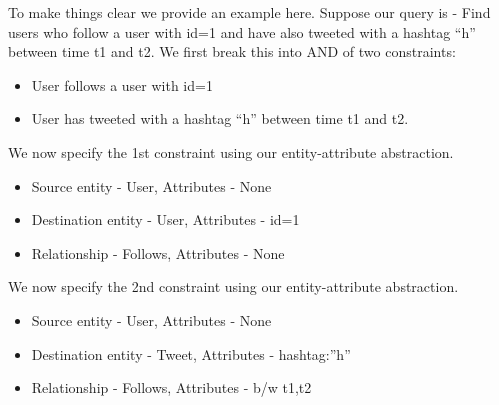 \documentclass[letterpaper,10pt,english]{sphinxmanual}
\begin{document}
To make things clear we provide an example here.
Suppose our query is - Find users who follow a user with id=1 and have also tweeted with a hashtag “h” between time t1 and t2.
We first break this into AND of two constraints:
\begin{itemize}
\item {} 
User follows a user with id=1

\item {} 
User has tweeted with a hashtag “h” between time t1 and t2.

\end{itemize}

We now specify the 1st constraint using our entity-attribute abstraction.
\begin{itemize}
\item {} 
Source entity - User, Attributes - None

\item {} 
Destination entity - User, Attributes - id=1

\item {} 
Relationship - Follows, Attributes - None

\end{itemize}

We now specify the 2nd constraint using our entity-attribute abstraction.
\begin{itemize}
\item {} 
Source entity - User, Attributes - None

\item {} 
Destination entity - Tweet, Attributes - hashtag:”h”

\item {} 
Relationship - Follows, Attributes - b/w t1,t2

\end{itemize}
\end{document}
